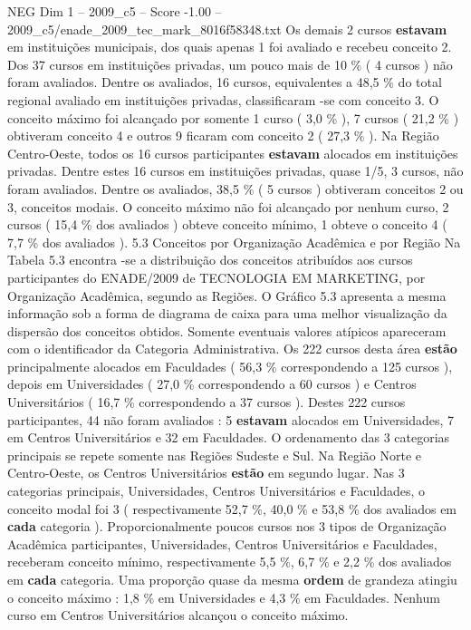 \begin{textsample}{NEG Dim 1 – 2009\_c5 – Score -1.00 – 2009\_c5/enade\_2009\_tec\_mark\_8016f58348.txt}
Os demais 2 cursos \textbf{estavam} em instituições municipais, dos quais apenas 1 foi avaliado e recebeu conceito 2.
Dos 37 cursos em instituições privadas, um pouco mais de 10 \% ( 4 cursos ) não foram avaliados.
Dentre os avaliados, 16 cursos, equivalentes a 48,5 \% do total regional avaliado em instituições privadas, classificaram -se com conceito 3.
O conceito máximo foi alcançado por somente 1 curso ( 3,0 \% ), 7 cursos ( 21,2 \% ) obtiveram conceito 4 e outros 9 ficaram com conceito 2 ( 27,3 \% ).
Na Região Centro-Oeste, todos os 16 cursos participantes \textbf{estavam} alocados em instituições privadas.
Dentre estes 16 cursos em instituições privadas, quase 1/5, 3 cursos, não foram avaliados.
Dentre os avaliados, 38,5 \% ( 5 cursos ) obtiveram conceitos 2 ou 3, conceitos modais.
O conceito máximo não foi alcançado por nenhum curso, 2 cursos ( 15,4 \% dos avaliados ) obteve conceito mínimo, 1 obteve o conceito 4 ( 7,7 \% dos avaliados ). 5.3 Conceitos por Organização Acadêmica e por Região Na Tabela 5.3 encontra -se a distribuição dos conceitos atribuídos aos cursos participantes do ENADE/2009 de TECNOLOGIA EM MARKETING, por Organização Acadêmica, segundo as Regiões.
O Gráfico 5.3 apresenta a mesma informação sob a forma de diagrama de caixa para uma melhor visualização da dispersão dos conceitos obtidos.
Somente eventuais valores atípicos apareceram com o identificador da Categoria Administrativa.
Os 222 cursos desta área \textbf{estão} principalmente alocados em Faculdades ( 56,3 \% correspondendo a 125 cursos ), depois em Universidades ( 27,0 \% correspondendo a 60 cursos ) e Centros Universitários ( 16,7 \% correspondendo a 37 cursos ).
Destes 222 cursos participantes, 44 não foram avaliados : 5 \textbf{estavam} alocados em Universidades, 7 em Centros Universitários e 32 em Faculdades.
O ordenamento das 3 categorias principais se repete somente nas Regiões Sudeste e Sul.
Na Região Norte e Centro-Oeste, os Centros Universitários \textbf{estão} em segundo lugar.
Nas 3 categorias principais, Universidades, Centros Universitários e Faculdades, o conceito modal foi 3 ( respectivamente 52,7 \%, 40,0 \% e 53,8 \% dos avaliados em \textbf{cada} categoria ).
Proporcionalmente poucos cursos nos 3 tipos de Organização Acadêmica participantes, Universidades, Centros Universitários e Faculdades, receberam conceito mínimo, respectivamente 5,5 \%, 6,7 \% e 2,2 \% dos avaliados em \textbf{cada} categoria.
Uma proporção quase da mesma \textbf{ordem} de grandeza atingiu o conceito máximo : 1,8 \% em Universidades e 4,3 \% em Faculdades.
Nenhum curso em Centros Universitários alcançou o conceito máximo.

\end{textsample}
